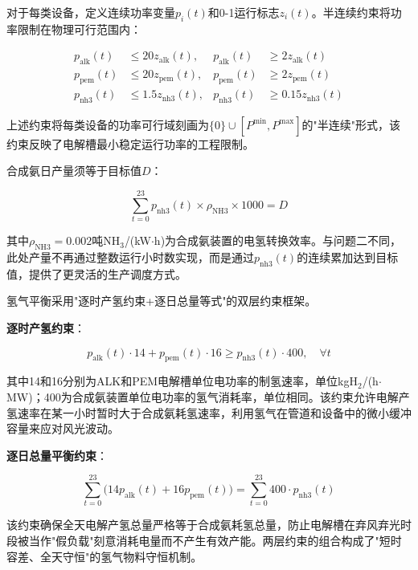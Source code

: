 \documentclass[zihao=-4,a4paper]{ctexart} %
\begin{document}
	对于每类设备，定义连续功率变量$p_i(t)$和0-1运行标志$z_i(t)$。半连续约束将功率限制在物理可行范围内：
	
	\begin{align}
		p_{\text{alk}}(t) &\leq 20 z_{\text{alk}}(t), &
		p_{\text{alk}}(t) &\geq 2 z_{\text{alk}}(t) \label{eq:semi_alk}\\
		p_{\text{pem}}(t) &\leq 20 z_{\text{pem}}(t), &
		p_{\text{pem}}(t) &\geq 2 z_{\text{pem}}(t) \label{eq:semi_pem}\\
		p_{\text{nh3}}(t) &\leq 1.5 z_{\text{nh3}}(t), &
		p_{\text{nh3}}(t) &\geq 0.15 z_{\text{nh3}}(t) \label{eq:semi_nh3}
	\end{align}
	
	上述约束将每类设备的功率可行域刻画为$\{0\} \cup [P^{\min}, P^{\max}]$的"半连续"形式，该约束反映了电解槽最小稳定运行功率的工程限制。
	
	合成氨日产量须等于目标值$D$：
	
	\begin{equation}
		\sum_{t=0}^{23} p_{\text{nh3}}(t) \times \rho_{\text{NH3}} \times 1000 = D
		\label{eq:prod_target}
	\end{equation}
	
	其中$\rho_{\text{NH3}} = 0.002$吨NH$_3$/(kW$\cdot$h)为合成氨装置的电氢转换效率。与问题二不同，此处产量不再通过整数运行小时数实现，而是通过$p_{\text{nh3}}(t)$的连续累加达到目标值，提供了更灵活的生产调度方式。
	
	氢气平衡采用"逐时产氢约束+逐日总量等式"的双层约束框架。
	
	\textbf{逐时产氢约束}：
	
	\begin{equation}
		p_{\text{alk}}(t) \cdot 14 + p_{\text{pem}}(t) \cdot 16 \geq p_{\text{nh3}}(t) \cdot 400, \quad \forall t
		\label{eq:h2_hourly}
	\end{equation}
	
	其中14和16分别为ALK和PEM电解槽单位电功率的制氢速率，单位kgH$_2$/(h$\cdot$MW)；400为合成氨装置单位电功率的氢气消耗率，单位相同。该约束允许电解产氢速率在某一小时暂时大于合成氨耗氢速率，利用氢气在管道和设备中的微小缓冲容量来应对风光波动。
	
	\textbf{逐日总量平衡约束}：
	
	\begin{equation}
		\sum_{t=0}^{23} \bigl(14 p_{\text{alk}}(t) + 16 p_{\text{pem}}(t)\bigr) = \sum_{t=0}^{23} 400 \cdot p_{\text{nh3}}(t)
		\label{eq:h2_daily}
	\end{equation}
	
	该约束确保全天电解产氢总量严格等于合成氨耗氢总量，防止电解槽在弃风弃光时段被当作"假负载"刻意消耗电量而不产生有效产能。两层约束的组合构成了"短时容差、全天守恒"的氢气物料守恒机制。
	
\end{document}

